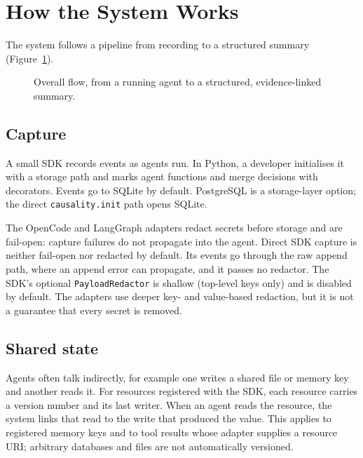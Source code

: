 \documentclass[11pt]{article}
\newcommand{\code}[1]{\textcolor{codegreen}{\texttt{#1}}}
\begin{document}
\section{How the System Works}\label{sec:system}
The system follows a pipeline from recording to a structured summary (Figure~\ref{fig:pipe}).

\begin{figure}[t]
\centering
{}
\caption{Overall flow, from a running agent to a structured, evidence-linked summary.}
\label{fig:pipe}
\end{figure}

\subsection{Capture}\label{sec:capture}
A small SDK records events as agents run. In Python, a developer initialises it with a storage path and marks agent functions and merge decisions with decorators. Events go to SQLite by default. PostgreSQL is a storage-layer option; the direct \code{causality.init} path opens SQLite.

The OpenCode and LangGraph adapters redact secrets before storage and are fail-open: capture failures do not propagate into the agent. Direct SDK capture is neither fail-open nor redacted by default. Its events go through the raw append path, where an append error can propagate, and it passes no redactor. The SDK's optional \code{PayloadRedactor} is shallow (top-level keys only) and is disabled by default. The adapters use deeper key- and value-based redaction, but it is not a guarantee that every secret is removed.

\subsection{Shared state}\label{sec:shared}
Agents often talk indirectly, for example one writes a shared file or memory key and another reads it. For resources registered with the SDK, each resource carries a version number and its last writer. When an agent reads the resource, the system links that read to the write that produced the value. This applies to registered memory keys and to tool results whose adapter supplies a resource URI; arbitrary databases and files are not automatically versioned.
\end{document}
